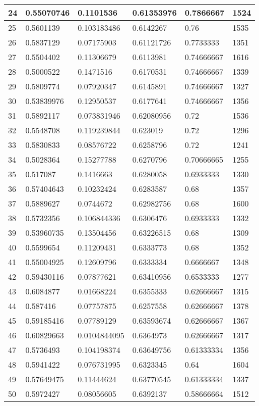 \begin{longtable}{|l|l|l|l|l|l|}
24 & 0.55070746 & 0.1101536 & 0.61353976 & 0.7866667 & 1524 \\ \hline 
25 & 0.5601139 & 0.103183486 & 0.6142267 & 0.76 & 1535 \\ \hline 
26 & 0.5837129 & 0.07175903 & 0.61121726 & 0.7733333 & 1351 \\ \hline 
27 & 0.5504402 & 0.11306679 & 0.6113981 & 0.74666667 & 1616 \\ \hline 
28 & 0.5000522 & 0.1471516 & 0.6170531 & 0.74666667 & 1339 \\ \hline 
29 & 0.5809774 & 0.07920347 & 0.6145891 & 0.74666667 & 1327 \\ \hline 
30 & 0.53839976 & 0.12950537 & 0.6177641 & 0.74666667 & 1356 \\ \hline 
31 & 0.5892117 & 0.073831946 & 0.62080956 & 0.72 & 1536 \\ \hline 
32 & 0.5548708 & 0.119239844 & 0.623019 & 0.72 & 1296 \\ \hline 
33 & 0.5830833 & 0.08576722 & 0.6258796 & 0.72 & 1241 \\ \hline 
34 & 0.5028364 & 0.15277788 & 0.6270796 & 0.70666665 & 1255 \\ \hline 
35 & 0.517087 & 0.1416663 & 0.6280058 & 0.6933333 & 1330 \\ \hline 
36 & 0.57404643 & 0.10232424 & 0.6283587 & 0.68 & 1357 \\ \hline 
37 & 0.5889627 & 0.0744672 & 0.62982756 & 0.68 & 1600 \\ \hline 
38 & 0.5732356 & 0.106844336 & 0.6306476 & 0.6933333 & 1332 \\ \hline 
39 & 0.53960735 & 0.13504456 & 0.63226515 & 0.68 & 1309 \\ \hline 
40 & 0.5599654 & 0.11209431 & 0.6333773 & 0.68 & 1352 \\ \hline 
41 & 0.55004925 & 0.12609796 & 0.6333334 & 0.6666667 & 1348 \\ \hline 
42 & 0.59430116 & 0.07877621 & 0.63410956 & 0.6533333 & 1277 \\ \hline 
43 & 0.6084877 & 0.01668224 & 0.6355333 & 0.62666667 & 1315 \\ \hline 
44 & 0.587416 & 0.07757875 & 0.6257558 & 0.62666667 & 1378 \\ \hline 
45 & 0.59185416 & 0.07789129 & 0.63593674 & 0.62666667 & 1367 \\ \hline 
46 & 0.60829663 & 0.0104844095 & 0.6364973 & 0.62666667 & 1317 \\ \hline 
47 & 0.5736493 & 0.104198374 & 0.63649756 & 0.61333334 & 1356 \\ \hline 
48 & 0.5941422 & 0.076731995 & 0.6323345 & 0.64 & 1604 \\ \hline 
49 & 0.57649475 & 0.11444624 & 0.63770545 & 0.61333334 & 1337 \\ \hline 
50 & 0.5972427 & 0.08056605 & 0.6392137 & 0.58666664 & 1512 \\ \hline 
\end{longtable}